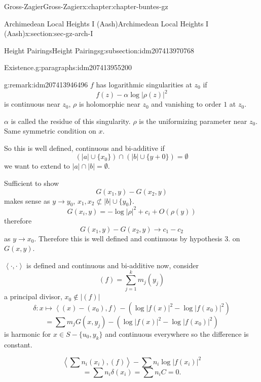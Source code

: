 \documentclass[oneside,10pt,]{book}
\numberwithin{equation}{section}
\newcommand{\pair}[2]{\left\langle #1, #2 \right\rangle}
\begin{document}
\begin{chapterptx}{Gross-Zagier}{}{Gross-Zagier}{}{}{x:chapter:chapter-buntes-gz}
\begin{sectionptx}{Archimedean Local Heights I (Aash)}{}{Archimedean Local Heights I (Aash)}{}{}{x:section:sec-gz-arch-I}
\begin{subsectionptx}{Height Pairings}{}{Height Pairings}{}{}{g:subsection:idm207413970768}
\begin{paragraphs}{Existence.}{g:paragraphs:idm207413955200}
\begin{remark}{}{g:remark:idm207413946496}
\(f\) has logarithmic singularities at \(z_0\) if%
\begin{equation*}
f(z) - \alpha \log|\rho (z)|^2
\end{equation*}
is continuous near \(z_0\), \(\rho \) is holomorphic near \(z_0\) and vanishing to order \(1\) at \(z_0\).%
\par
\(\alpha \) is called the residue of this singularity. \(\rho \) is the uniformizing parameter near \(z_0\). Same symmetric condition on \(x\).%
\end{remark}
So this is well defined, continuous and bi-additive if%
\begin{equation*}
(|a| \cup\{x_0\}) \cap (|b| \cup \{y+0\} ) = \emptyset
\end{equation*}
we want to extend to \(|a|\cap |b| = \emptyset\).%
\par
Sufficient to show%
\begin{equation*}
G(x_1,y) -G(x_2,y)
\end{equation*}
makes sense as \(y\to y_0\), \(x_1, x_2 \not \subset |b| \cup\{y_0\}\).%
\begin{equation*}
G(x_i, y) = - \log|\rho |^2 + c_i + O(\rho (y))
\end{equation*}
therefore%
\begin{equation*}
G(x_1,y) - G(x_2,y) \to c_1  - c_2
\end{equation*}
as \(y \to x_0\). Therefore this is well defined and continuous by hypothesis 3. on \(G(x,y)\).%
\par
\(\pair\cdot\cdot\) is defined and continuous and bi-additive now, consider%
\begin{equation*}
(f) = \sum_{j=1}^ k m_j (y_j)
\end{equation*}
a principal divisor, \(x_0 \not \in |(f)|\)%
\begin{equation*}
\delta \colon x\mapsto \pair {(x) - (x_0) }{f} - \left(\log|f(x)|^2 - \log|f(x_0)|^2\right)
\end{equation*}
%
\begin{equation*}
= \sum m_j G(x,y_j) - \left( \log|f(x)| ^2 - \log|f(x_0)|^2\right)
\end{equation*}
is harmonic for \(x \in S - \{u_0, y_k\}\) and continuous everywhere so the difference is constant.%
\par
%
\begin{equation*}
\pair {\sum n_i(x_i)}{(f)} - \sum n_i \log|f(x_i)|^2
\end{equation*}
%
\begin{equation*}
=\sum n_i \delta (x_i) = \sum n_i C = 0\text{.}

\end{equation*}
\end{paragraphs}
\end{subsectionptx}
\end{sectionptx}
\end{chapterptx}
\end{document}

